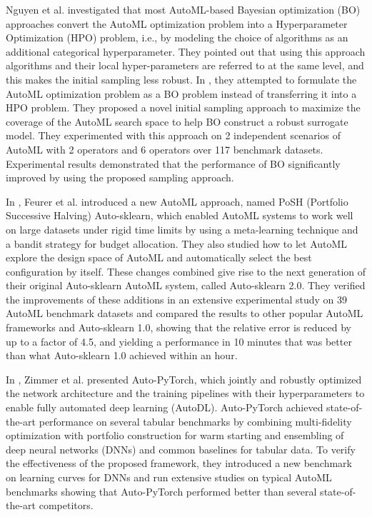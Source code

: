 Nguyen et al. investigated that most AutoML-based Bayesian optimization (BO) approaches convert the AutoML optimization problem into a Hyperparameter Optimization (HPO) problem, i.e., by modeling the choice of algorithms as an additional categorical hyperparameter.
They pointed out that using this approach algorithms and their local hyper-parameters are referred to at the same level, and this makes the initial sampling less robust.
In \cite{9660073}, they attempted to formulate the AutoML optimization problem as a BO problem instead of transferring it into a HPO problem.
They proposed a novel initial sampling approach to maximize the coverage of the AutoML search space to help BO construct a robust surrogate model.
They experimented with this approach on 2 independent scenarios of AutoML with 2 operators and 6 operators over 117 benchmark datasets.
Experimental results demonstrated that the performance of BO significantly improved by using the proposed sampling approach.

In \cite{Feurer2020}, Feurer et al. introduced a new AutoML approach, named PoSH (Portfolio Successive Halving) Auto-sklearn, which enabled AutoML systems to work well on large datasets under rigid time limits by using a meta-learning technique and a bandit strategy for budget allocation.
They also studied how to let AutoML explore the design space of AutoML and automatically select the best configuration by itself.
These changes combined give rise to the next generation of their original Auto-sklearn AutoML system, called Auto-sklearn 2.0.
They verified the improvements of these additions in an extensive experimental study on 39 AutoML benchmark datasets and compared the results to other popular AutoML frameworks and Auto-sklearn 1.0, showing that the relative error is reduced by up to a factor of 4.5, and yielding a performance in 10 minutes that was better than what Auto-sklearn 1.0 achieved within an hour.

In \cite{Zimmer2020}, Zimmer et al. presented Auto-PyTorch, which jointly and robustly optimized the network architecture and the training pipelines with their hyperparameters to enable fully automated deep learning (AutoDL).
Auto-PyTorch achieved state-of-the-art performance on several tabular benchmarks by combining multi-fidelity optimization with portfolio construction for warm starting and ensembling of deep neural networks (DNNs) and common baselines for tabular data.
To verify the effectiveness of the proposed framework, they introduced a new benchmark on learning curves for DNNs and run extensive studies on typical AutoML benchmarks showing that Auto-PyTorch performed better than several state-of-the-art competitors.

